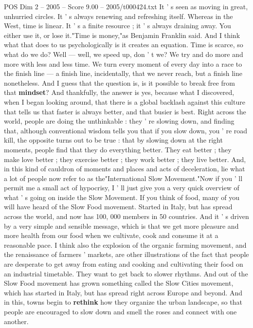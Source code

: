 \begin{textsample}{POS Dim 2 – 2005 – Score 9.00 – 2005/t000424.txt}
It ' s seen as moving in great, unhurried circles.
It ' s always renewing and refreshing itself.
Whereas in the West, time is linear.
It ' s a finite resource ; it ' s always draining away.
You either use it, or lose it."Time is money,"as Benjamin Franklin said.
And I think what that does to us psychologically is it creates an equation.
Time is scarce, so what do we do?
Well — well, we speed up, don ' t we?
We try and do more and more with less and less time.
We turn every moment of every day into a race to the finish line — a finish line, incidentally, that we never reach, but a finish line nonetheless.
And I guess that the question is, is it possible to break free from that \textbf{mindset}?
And thankfully, the answer is yes, because what I discovered, when I began looking around, that there is a global backlash against this culture that tells us that faster is always better, and that busier is best.
Right across the world, people are doing the unthinkable : they ' re slowing down, and finding that, although conventional wisdom tells you that if you slow down, you ' re road kill, the opposite turns out to be true : that by slowing down at the right moments, people find that they do everything better.
They eat better ; they make love better ; they exercise better ; they work better ; they live better.
And, in this kind of cauldron of moments and places and acts of deceleration, lie what a lot of people now refer to as the"International Slow Movement."Now if you ' ll permit me a small act of hypocrisy, I ' ll just give you a very quick overview of what ' s going on inside the Slow Movement.
If you think of food, many of you will have heard of the Slow Food movement.
Started in Italy, but has spread across the world, and now has 100, 000 members in 50 countries.
And it ' s driven by a very simple and sensible message, which is that we get more pleasure and more health from our food when we cultivate, cook and consume it at a reasonable pace.
I think also the explosion of the organic farming movement, and the renaissance of farmers ' markets, are other illustrations of the fact that people are desperate to get away from eating and cooking and cultivating their food on an industrial timetable.
They want to get back to slower rhythms.
And out of the Slow Food movement has grown something called the Slow Cities movement, which has started in Italy, but has spread right across Europe and beyond.
And in this, towns begin to \textbf{rethink} how they organize the urban landscape, so that people are encouraged to slow down and smell the roses and connect with one another.

\end{textsample}
